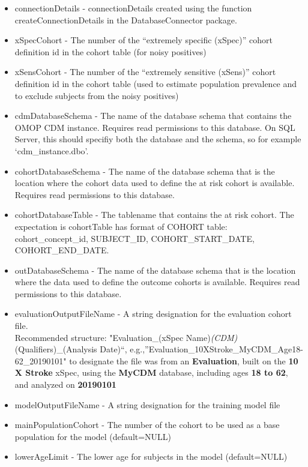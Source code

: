 \documentclass[
]{article}
\providecommand{\tightlist}{%
  \setlength{\itemsep}{0pt}\setlength{\parskip}{0pt}}
\begin{document}
\begin{itemize}
\tightlist
\item
  connectionDetails - connectionDetails created using the function
  createConnectionDetails in the DatabaseConnector package.
\item
  xSpecCohort - The number of the ``extremely specific (xSpec)'' cohort
  definition id in the cohort table (for noisy positives)
\item
  xSensCohort - The number of the ``extremely sensitive (xSens)'' cohort
  definition id in the cohort table (used to estimate population
  prevalence and to exclude subjects from the noisy positives)
\item
  cdmDatabaseSchema - The name of the database schema that contains the
  OMOP CDM instance. Requires read permissions to this database. On SQL
  Server, this should specifiy both the database and the schema, so for
  example `cdm\_instance.dbo'.
\item
  cohortDatabaseSchema - The name of the database schema that is the
  location where the cohort data used to define the at risk cohort is
  available. Requires read permissions to this database.
\item
  cohortDatabaseTable - The tablename that contains the at risk cohort.
  The expectation is cohortTable has format of COHORT table:
  cohort\_concept\_id, SUBJECT\_ID, COHORT\_START\_DATE,
  COHORT\_END\_DATE.
\item
  outDatabaseSchema - The name of the database schema that is the
  location where the data used to define the outcome cohorts is
  available. Requires read permissions to this database.
\item
  evaluationOutputFileName - A string designation for the evaluation
  cohort file.\\
  Recommended structure: "Evaluation\_(xSpec
  Name)\emph{(CDM)}(Qualifiers)\_(Analysis Date)``,
  e.g.,''Evaluation\_10XStroke\_MyCDM\_Age18-62\_20190101" to designate
  the file was from an \textbf{Evaluation}, built on the \textbf{10 X
  Stroke} xSpec, using the \textbf{MyCDM} database, including ages
  \textbf{18 to 62}, and analyzed on \textbf{20190101}
\item
  modelOutputFileName - A string designation for the training model file
\item
  mainPopulationCohort - The number of the cohort to be used as a base
  population for the model (default=NULL)
\item
  lowerAgeLimit - The lower age for subjects in the model (default=NULL)

\end{itemize}
\end{document}
